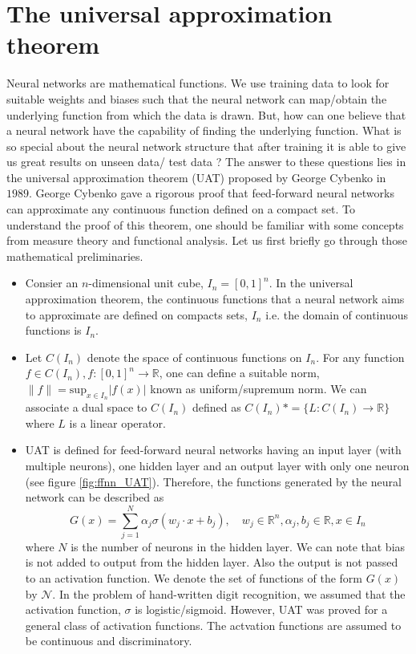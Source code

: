 \section{The universal approximation theorem}
Neural networks are mathematical functions. We use training data to look for suitable weights and biases
such that the neural network can map/obtain the underlying function from which the data is drawn. But, how can one
believe that a neural network have the capability of finding the underlying function. What is so special about the
neural network structure that after training it is able to give us great results on unseen data/ test data ? The answer to these
questions lies in the universal approximation theorem (UAT) proposed by George Cybenko in $1989$. 
George Cybenko gave a rigorous proof that feed-forward neural networks can approximate any continuous function defined on a compact set. To understand the 
proof of this theorem, one should be familiar with some concepts from measure theory and functional analysis. 
Let us first briefly go through those mathematical preliminaries.
\begin{itemize}
    \item Consier an $n$-dimensional unit cube, $I_n = [0,1]^n$. In the universal approximation theorem, the continuous
    functions that a neural network aims to approximate are defined on compacts sets, $I_n$ i.e. the domain of continuous
    functions is $I_n$. 
    \item Let $C(I_n)$ denote the space of continuous functions on $I_n$.
    For any function $f \in C(I_n), f : [0,1]^n \rightarrow \mathbb{R}$, one can define a suitable norm, 
    $\|f\| = \text{sup}_{x \in I_n} |f(x)|$ known as uniform/supremum norm. We can associate a dual space to $C(I_n)$ 
    defined as $C(I_n)* = \{L : C(I_n) \rightarrow \mathbb{R}\}$ where $L$ is a linear operator.
    \item UAT is defined for feed-forward neural networks having an input layer (with multiple neurons), one hidden layer and
    an output layer with only one neuron (see figure \ref{fig:ffnn_UAT}). Therefore, the functions generated by the neural network can be described as
    $$G(x) = \sum_{j=1}^{N} \alpha_j \sigma (w_j\cdot x + b_j), \quad w_j \in \mathbb{R}^n, \alpha_j, b_j \in \mathbb{R}, x \in I_n$$
    where $N$ is the number of neurons in the hidden layer. We can note that bias is not added to output from the hidden
    layer. Also the output is not passed to an activation function. We denote the set of functions of the form $G(x)$
    by $\mathcal{N}$. In the problem of hand-written digit recognition, we assumed that the activation function, $\sigma$ is logistic/sigmoid. 
    However, UAT was proved for a general class of activation functions. The actvation functions are assumed to be continuous and 
    discriminatory. 
\end{itemize} 
